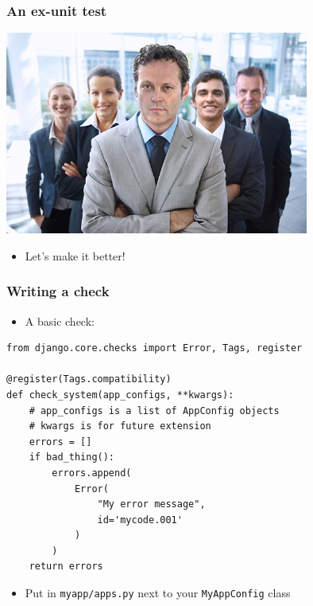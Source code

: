 \documentclass{beamer}
\begin{document}
\begin{frame}[fragile]\frametitle{An ex-unit test}

    \begin{center}
        \includegraphics[width=10cm]{better}
    \end{center}

    \begin{itemize}
        \item Let's make it better!
    \end{itemize}

\end{frame}


\begin{frame}[fragile]\frametitle{Writing a check}

    \begin{itemize}
        \item A basic check:
    \end{itemize}

    \begin{lstlisting}
from django.core.checks import Error, Tags, register

@register(Tags.compatibility)
def check_system(app_configs, **kwargs):
    # app_configs is a list of AppConfig objects
    # kwargs is for future extension
    errors = []
    if bad_thing():
        errors.append(
            Error(
                "My error message",
                id='mycode.001'
            )
        )
    return errors
    \end{lstlisting}

    \begin{itemize}
        \item Put in \texttt{myapp/apps.py} next to your \texttt{MyAppConfig} class
    \end{itemize}

\end{frame}
\end{document}
